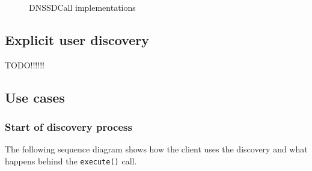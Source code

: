 \begin{figure}[H]
 \centering
 \caption{DNSSDCall implementations}
 \label{fig:network.discovery.manager}
\end{figure}

\subsection{Explicit user discovery}
TODO!!!!!!

\subsection{Use cases}
\subsubsection{Start of discovery process}
The following sequence diagram shows how the client uses the discovery and what happens behind the \texttt{execute()} call.

